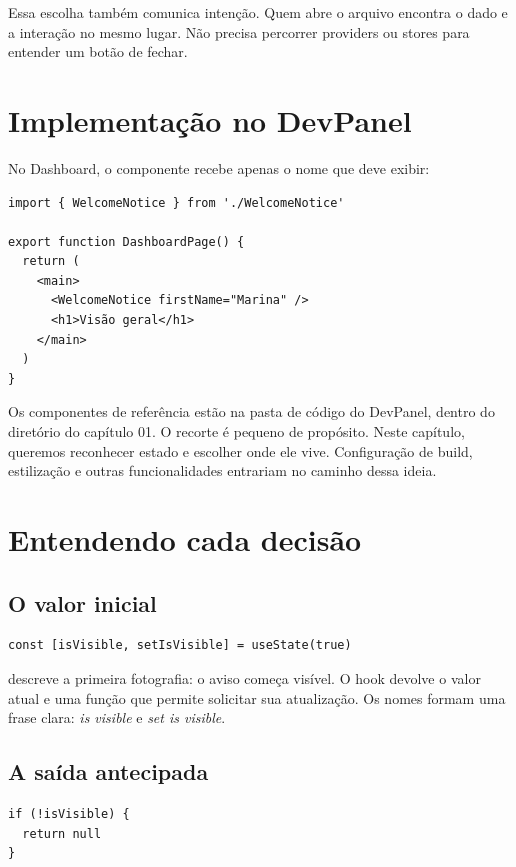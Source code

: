 Essa escolha também comunica intenção. Quem abre o arquivo encontra o dado e a
interação no mesmo lugar. Não precisa percorrer providers ou stores para
entender um botão de fechar.

\section{Implementação no DevPanel}

No Dashboard, o componente recebe apenas o nome que deve exibir:

\begin{lstlisting}[caption={O Dashboard não gerencia detalhes do aviso.}]
import { WelcomeNotice } from './WelcomeNotice'

export function DashboardPage() {
  return (
    <main>
      <WelcomeNotice firstName="Marina" />
      <h1>Visão geral</h1>
    </main>
  )
}
\end{lstlisting}

Os componentes de referência estão na pasta de código do DevPanel, dentro do
diretório do capítulo 01. O recorte é pequeno de propósito. Neste capítulo,
queremos reconhecer estado e escolher onde ele vive. Configuração de build,
estilização e outras funcionalidades entrariam no caminho dessa ideia.

\section{Entendendo cada decisão}

\subsection{O valor inicial}

\begin{lstlisting}
const [isVisible, setIsVisible] = useState(true)
\end{lstlisting}

 descreve a primeira fotografia: o aviso começa visível. O hook
devolve o valor atual e uma função que permite solicitar sua atualização. Os
nomes formam uma frase clara: \emph{is visible} e \emph{set is visible}.

\subsection{A saída antecipada}

\begin{lstlisting}
if (!isVisible) {
  return null
}
\end{lstlisting}

